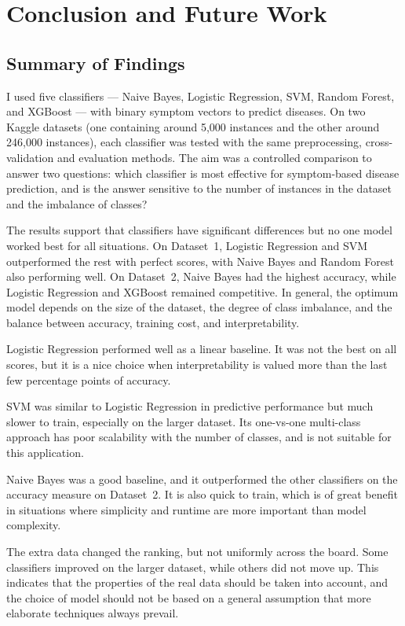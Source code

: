 \chapter{Conclusion and Future Work}
\label{ch:conclusion}

\section{Summary of Findings}
\label{sec:summary}

I used five classifiers --- Naive Bayes, Logistic Regression, SVM, Random Forest, and XGBoost --- with binary symptom vectors to predict diseases. On two Kaggle datasets (one containing around 5,000 instances and the other around 246,000 instances), each classifier was tested with the same preprocessing, cross-validation and evaluation methods. The aim was a controlled comparison to answer two questions: which classifier is most effective for symptom-based disease prediction, and is the answer sensitive to the number of instances in the dataset and the imbalance of classes?

The results support that classifiers have significant differences but no one model worked best for all situations. On Dataset~1, Logistic Regression and SVM outperformed the rest with perfect scores, with Naive Bayes and Random Forest also performing well. On Dataset~2, Naive Bayes had the highest accuracy, while Logistic Regression and XGBoost remained competitive. In general, the optimum model depends on the size of the dataset, the degree of class imbalance, and the balance between accuracy, training cost, and interpretability.

Logistic Regression performed well as a linear baseline. It was not the best on all scores, but it is a nice choice when interpretability is valued more than the last few percentage points of accuracy.

SVM was similar to Logistic Regression in predictive performance but much slower to train, especially on the larger dataset. Its one-vs-one multi-class approach has poor scalability with the number of classes, and is not suitable for this application.

Naive Bayes was a good baseline, and it outperformed the other classifiers on the accuracy measure on Dataset~2. It is also quick to train, which is of great benefit in situations where simplicity and runtime are more important than model complexity.

The extra data changed the ranking, but not uniformly across the board. Some classifiers improved on the larger dataset, while others did not move up. This indicates that the properties of the real data should be taken into account, and the choice of model should not be based on a general assumption that more elaborate techniques always prevail.

